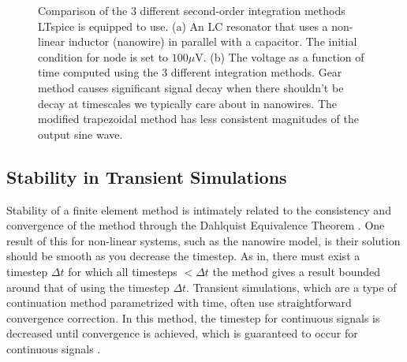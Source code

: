 \begin{figure}
    \centering
    \caption{Comparison of the 3 different second-order integration methods
    LTspice is equipped to use. (a) An LC resonator that uses a non-linear inductor
    (nanowire) in parallel with a capacitor. The initial condition for node  is set
    to $100\mu$V.
    (b) The voltage as a function of time
    computed using the 3 different integration methods. Gear method causes significant
    signal decay when there shouldn't be decay at timescales we typically care about 
    in nanowires. The modified trapezoidal method
    has less consistent magnitudes of the output sine wave.}
    \label{fig:trapz_vs_gear}
\end{figure}

\subsection{Stability in Transient Simulations}

Stability of a finite element method is intimately related to the consistency and convergence of
the method through the Dahlquist Equivalence Theorem \cite{DAHLQUIST}. 
One result of this for non-linear systems,
such as the nanowire model, is their solution should be smooth as you decrease the timestep.
As in, there must exist a timestep $\Delta t$ for which all timesteps $< \Delta t$ the method
gives a result bounded around that of using the timestep $\Delta t$. Transient simulations, which are a 
type of continuation method parametrized with time, often use straightforward convergence correction. 
In this method, the timestep for continuous signals is decreased until convergence is achieved, 
which is guaranteed to occur for continuous signals \cite{spice-book}.

